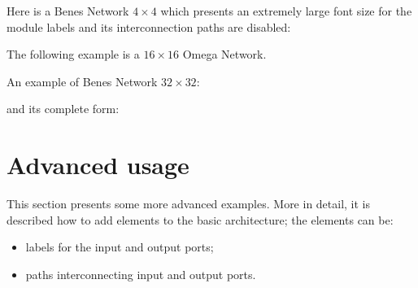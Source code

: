 \documentclass{ltxdoc}
\begin{document}
Here is a Benes Network $4 \times 4$ which presents an extremely large font size for the module labels and its interconnection paths are disabled:
\begin{codeexample}[]
\tikzset{my style, P=4, 
 module font=\huge\slshape, 
 connections disabled=true
}
\end{codeexample}

The following example is a $16 \times 16$ Omega Network.
\begin{codeexample}[]
\tikzset{module size=0.6cm,pin length factor=0.6,
         module ysep=0.65, module xsep=3.5,}
\end{codeexample}

\pagebreak

An example of Benes Network $32 \times 32$:
\begin{codeexample}[]
\tikzset{module size=0.6cm,pin length factor=0.6,
         module ysep=0.9, module xsep=1.7,}
\begin{tikzpicture}[P=32]
    \node[benes] {};
\end{tikzpicture}
\end{codeexample}
\pagebreak

and its complete form:
\begin{codeexample}[]
\tikzset{module size=0.6cm,pin length factor=0.6,
         module ysep=1, module xsep=2.275}
\begin{tikzpicture}[P=32]
    \node[benes complete={module label opacity=0}] {};
\end{tikzpicture}
\end{codeexample}


\section{Advanced usage}
This section presents some more advanced examples. More in detail, it is described how to add elements to the basic architecture; the elements can be:
\begin{itemize}
\item labels for the input and output ports;
\item paths interconnecting input and output ports.
\end{itemize}
\end{document}
